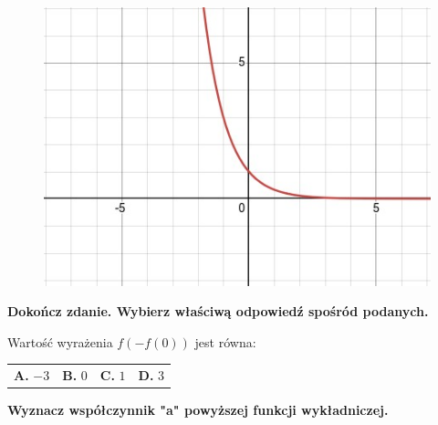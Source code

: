\documentclass[12pt,a4paper]{article}
\theoremstyle{break}
\begin{document}
	\begin{figure}[h]
		\centering
		\includegraphics[scale=0.7]{wifw.jpeg}
	\end{figure}
	
	
	\begin{zad}[0-1]
		\textbf{Dokończ zdanie. Wybierz właściwą odpowiedź spośród podanych.}
	\end{zad} 
	
	Wartość wyrażenia $f(-f(0))$ jest równa:
	
	\vspace{0.5cm}
	\begin{tabular}{p{3.5cm} p{3.5cm} p{3.5cm} p{3.5cm}}
		\textbf{A. }$-3$&
		\textbf{B. }$0$&
		\textbf{C. }$1$&
		\textbf{D. }$3$\\
	\end{tabular}
	
	
	\begin{zad}[0-3]
		\textbf{Wyznacz współczynnik "a" powyższej funkcji wykładniczej.}
	\end{zad} 
	
\end{document}
